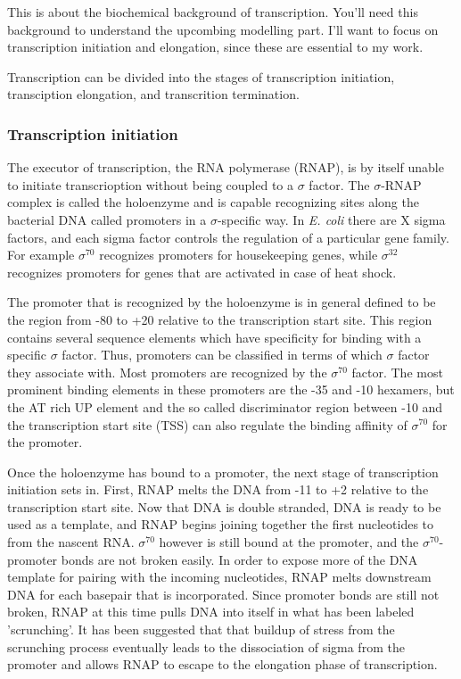%
%

This is about the biochemical background of transcription. You'll need this
background to understand the upcombing modelling part. I'll want to focus on
transcription initiation and elongation, since these are essential to my work.

Transcription can be divided into the stages of transcription initiation,
transciption elongation, and transcrition termination.

\subsubsection{Transcription initiation}
The executor of transcription, the RNA polymerase (RNAP), is by itself unable
to initiate transcrioption without being coupled to a $\sigma$ factor. The
$\sigma$-RNAP complex is called the holoenzyme and is capable 
recognizing sites along the bacterial DNA called promoters in a
$\sigma$-specific way. In \textit{E. coli} there are X sigma factors, and each
sigma factor controls the regulation of a particular gene family. For example
$\sigma^{70}$ recognizes promoters for housekeeping genes, while $\sigma^{32}$
recognizes promoters for genes that are activated in case of heat shock.

The promoter that is recognized by the holoenzyme is in general defined to be
the region from -80 to +20 relative to the transcription start site. This
region contains several sequence elements which have specificity for binding
with a specific $\sigma$ factor. Thus, promoters can be classified in terms of
which $\sigma$ factor they associate with. Most promoters are recognized by the
$\sigma^{70}$ factor. The most prominent binding elements in these promoters
are the -35 and -10 hexamers, but the AT rich UP element and the so called
discriminator region between -10 and the transcription start site (TSS) can
also regulate the binding affinity of $\sigma^{70}$ for the promoter.

Once the holoenzyme has bound to a promoter, the next stage of transcription
initiation sets in. First, RNAP melts the DNA from -11 to +2 relative to the
transcription start site. Now that DNA is double stranded, DNA is ready to be
used as a template, and RNAP begins joining together the first nucleotides to
from the nascent RNA. $\sigma^{70}$ however is still bound at the promoter, and
the $\sigma^{70}$-promoter bonds are not broken easily. In order to expose more
of the DNA template for pairing with the incoming nucleotides, RNAP melts
downstream DNA for each basepair that is incorporated. Since promoter bonds are
still not broken, RNAP at this time pulls DNA into itself in what has been
labeled 'scrunching'. It has been suggested that that buildup of stress from
the scrunching process eventually leads to the dissociation of sigma from the
promoter and allows RNAP to escape to the elongation phase of transcription.

